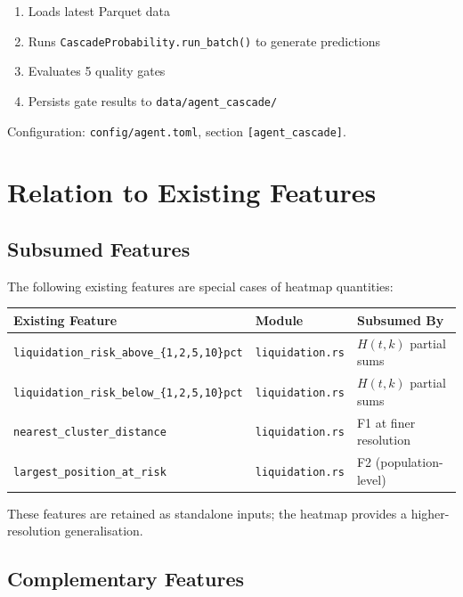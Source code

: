 \documentclass[11pt,a4paper]{article}
\begin{document}
\begin{enumerate}
    \item Loads latest Parquet data
    \item Runs \texttt{CascadeProbability.run\_batch()} to generate predictions
    \item Evaluates 5 quality gates
    \item Persists gate results to \texttt{data/agent\_cascade/}
\end{enumerate}

Configuration: \texttt{config/agent.toml}, section \texttt{[agent\_cascade]}.

\section{Relation to Existing Features}

\subsection{Subsumed Features}

The following existing features are special cases of heatmap quantities:

\begin{center}
\begin{tabular}{lll}
\toprule
\textbf{Existing Feature} & \textbf{Module} & \textbf{Subsumed By} \\
\midrule
\texttt{liquidation\_risk\_above\_\{1,2,5,10\}pct} & \texttt{liquidation.rs} & $H(t,k)$ partial sums \\
\texttt{liquidation\_risk\_below\_\{1,2,5,10\}pct} & \texttt{liquidation.rs} & $H(t,k)$ partial sums \\
\texttt{nearest\_cluster\_distance} & \texttt{liquidation.rs} & F1 at finer resolution \\
\texttt{largest\_position\_at\_risk} & \texttt{liquidation.rs} & F2 (population-level) \\
\bottomrule
\end{tabular}
\end{center}

These features are retained as standalone inputs; the heatmap provides a higher-resolution generalisation.

\subsection{Complementary Features}
\end{document}
